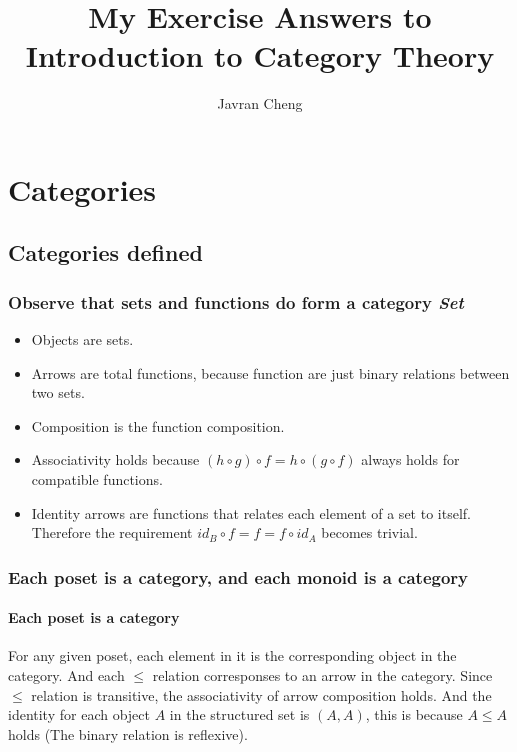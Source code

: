 \documentclass[11pt]{article}
\title{My Exercise Answers to \\
Introduction to Category Theory}
\author{Javran Cheng}
\begin{document}
\maketitle

\newcommand{\cat}[1]{\textit{#1}}
\newcommand{\fcomp}{\circ}

\newcommand{\nat}{\mathbb{N}}

\section{Categories}

\subsection{Categories defined}

\subsubsection{Observe that sets and functions do form a category \cat{Set}}

\begin{itemize}
  \item Objects are sets.
  \item Arrows are total functions, because function are just binary relations
    between two sets.
  \item Composition is the function composition.
  \item Associativity holds because $(h \fcomp g) \fcomp f = h \fcomp (g \fcomp f)$
    always holds for compatible functions.
  \item Identity arrows are functions that relates each element of a set to itself.
    Therefore the requirement $id_B \fcomp f = f = f \fcomp id_A$ becomes trivial.
\end{itemize}

\subsubsection{Each poset is a category, and each monoid is a category}

\paragraph{Each poset is a category} For any given poset, each element in it
is the corresponding object in the category. And each $\le$ relation corresponses
to an arrow in the category. Since $\le$ relation is transitive, the associativity
of arrow composition holds. And the identity for each object $A$ in the structured set is $(A,A)$,
this is because $A \le A$ holds (The binary relation is reflexive).
\end{document}
